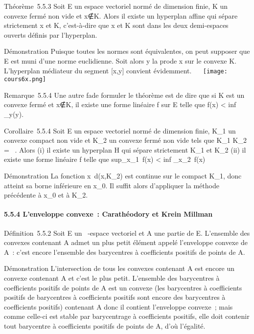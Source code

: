 \documentclass[]{article}
\begin{document}
Théorème~5.5.3 Soit E un espace vectoriel normé de dimension finie, K un
convexe fermé non vide et x∉K. Alors il
existe un hyperplan affine qui sépare strictement x et K, c'est-à-dire
que x et K sont dans les deux demi-espaces ouverts définis par
l'hyperplan.

Démonstration Puisque toutes les normes sont équivalentes, on peut
supposer que E est muni d'une norme euclidienne. Soit alors y la
pro\jmathection de x sur le convexe K. L'hyperplan médiateur du segment
{[}x,y{]} convient évidemment. ~~ \texttt{[image: cours6x.png]}

Remarque~5.5.4 Une autre fa\ccon de formuler le
théorème est de dire que si K est un convexe fermé et
x∉K, il existe une forme linéaire f sur E
telle que f(x) \textless{} inf~
\_y\inKf(y).

Corollaire~5.5.4 Soit E un espace vectoriel normé de dimension finie,
K\_1 un convexe compact non vide et K\_2 un convexe
fermé non vide tels que K\_1 \bigcap K\_2 = \varnothing~. Alors (i) il
existe un hyperplan H qui sépare strictement K\_1 et
K\_2 (ii) il existe une forme linéaire f telle que
sup\_x\inK\_1~f(x)
\textless{} inf \_x\inK\_2~f(x)

Démonstration La fonction x\mapsto~d(x,K\_2)
est continue sur le compact K\_1, donc atteint sa borne
inférieure en x\_0. Il suffit alors d'appliquer la méthode
précédente à x\_0 et à K\_2.

\paragraph{5.5.4 L'enveloppe convexe~: Carathéodory et Krein Millman}

Définition~5.5.2 Soit E un ~-espace vectoriel et A une partie de E.
L'ensemble des convexes contenant A admet un plus petit élément appelé
l'enveloppe convexe de A~: c'est encore l'ensemble des barycentres à
coefficients positifs de points de A.

Démonstration L'intersection de tous les convexes contenant A est encore
un convexe contenant A et c'est le plus petit. L'ensemble des
barycentres à coefficients positifs de points de A est un convexe (les
barycentres à coefficients positifs de barycentres à coefficients
positifs sont encore des barycentres à coefficients positifs) contenant
A donc il contient l'enveloppe convexe~; mais comme celle-ci est stable
par barycentrage à coefficients positifs, elle doit contenir tout
barycentre à coefficients positifs de points de A, d'où l'égalité.
\end{document}
